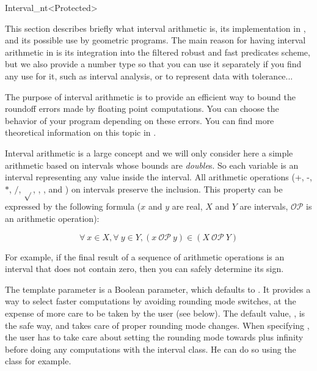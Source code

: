 
\begin{ccRefClass}{Interval_nt<Protected>}
\label{interval}


\ccDefinition

This section describes briefly what interval arithmetic is, its implementation
in {\cgal}, and its possible use by geometric programs.
The main reason for having interval arithmetic in {\cgal} is its integration
into the filtered robust and fast predicates scheme, but we also provide a
number type so that you can use it separately if you find any use for it,
such as interval analysis, or to represent data with tolerance...

The purpose of interval arithmetic is to provide an efficient way to bound
the roundoff errors made by floating point computations.
You can choose the behavior of your program depending on these errors. 
You can find more theoretical information on this topic in
\cite{cgal:bbp-iayed-01}.

Interval arithmetic is a large concept and we will only consider here a 
simple arithmetic based on intervals whose bounds are {\it double}s.
So each variable is an interval representing any value inside the interval.
All arithmetic operations (+, -, $*$, $/$, $\sqrt{}$, ,
,  and ) on intervals preserve the inclusion.
This property can be expressed by the following formula ($x$ and $y$ are
real, $X$ and $Y$ are intervals, $\mathcal{OP}$ is an arithmetic operation):

$$
\forall\ x \in X, \forall\ y \in Y, (x\ \mathcal{OP}\ y)
\in (X\ \mathcal{OP}\ Y)
$$

For example, if the final result of a sequence of arithmetic operations is
an interval that does not contain zero, then you can safely determine its sign.


\ccParameters

The template parameter  is a Boolean parameter, which defaults
to .  It provides a way to select faster computations by avoiding
rounding mode switches, at the expense of more care to be taken by the user
(see below).  The default value, , is the safe way, and takes care of
proper rounding mode changes.  When specifying , the user has to
take care about setting the rounding mode towards plus infinity before
doing any computations with the interval class.  He can do so using the
 class for example.


\end{ccRefClass}
